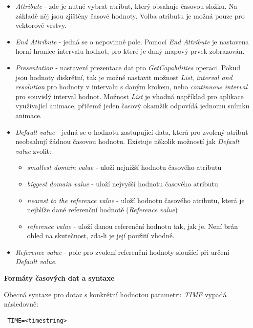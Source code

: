 \begin{itemize}
	\item \textit{Attribute} - zde je nutné vybrat atribut, který
obsahuje časovou složku. Na základě něj jsou zjištěny časové
hodnoty. Volba atributu je možná pouze pro vektorové vrstvy.
	\item \textit{End Attribute} - jedná se o nepovinné
pole. Pomocí \textit{End Attribute} je nastavena horní hranice
intervalu hodnot, pro které je daný mapový prvek zobrazován.
	\item \textit{Presentation} - nastavení prezentace dat pro
\textit{GetCapabilities} operaci. Pokud jsou hodnoty diskrétní, tak je
možné nastavit možnost \textit{List}, \textit{interval and resolution}
pro hodnoty v intervalu s daným krokem, nebo \textit{continuous
interval} pro souvislý interval hodnot. Možnost \textit{List} je
vhodná například pro aplikace využívající animace, přičemž jeden časový
okamžik odpovídá jednomu snímku animace.
	\item \textit{Default value} - jedná se o hodnotu zastupující data, která pro zvolený atribut neobsahují žádnou časovou
hodnotu. Existuje několik možností jak \textit{Default value} zvolit:
	\begin{itemize}
		\item \textit{smallest domain value} - uloží nejnižší
hodnotu časového atributu
		\item \textit{biggest domain value} - uloží nejvyšší
hodnotu časového atributu
		\item \textit{nearest to the reference value} - uloží
hodnotu časového atributu, která je nejblíže dané referenční hodnotě
(\textit{Reference value})
		\item \textit{reference value} - uloží danou
referenční hodnotu tak, jak je. Není brán ohled na skutečnost, zda-li je její použití vhodné.
	\end{itemize}
	\item \textit{Reference value} - pole pro zvolení referenční
hodnoty sloužící při určení \textit{Default value}.
\end{itemize}

\bigskip
\noindent \textbf{Formáty časových dat a syntaxe}

\noindent Obecná syntaxe pro dotaz s konkrétní hodnotou parametru
\textit{TIME} vypadá následovně:

\begin{verbatim} TIME=<timestring>
\end{verbatim}


